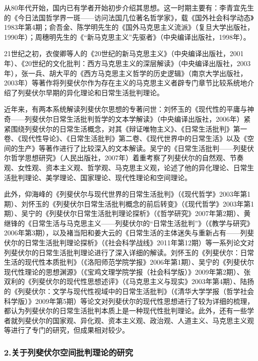 \documentclass[UTF8, fontset = sourcesans, a4paper, oneside, zihao =
-4, scheme=chinese, no-math, space=true]{ctexbook}
\begin{document}
从80年代开始，国内已有学者开始初步介绍其思想。这一时期主要有：李青宜先生的《今日法国哲学界一斑------访问法国几位著名哲学家》，载《国外社会科学动态》1983年第4期；俞吾金、陈学明先生的《国外马克思主义流派》（复旦大学出版社，1990年）；周穗明先生的《``新马克思主义''先驱者》（中央编译出版社，1998年）。

21世纪之初，衣俊卿等人的《20世纪的新马克思主义》（中央编译出版社，2001年）、《20世纪的文化批判：西方马克思主义的深层解读》（中央编译出版社，2003年），张一兵、胡大平的《西方马克思主义哲学的历史逻辑》（南京大学出版社，2003年）等著作将列斐伏尔作为存在主义的马克思主义者辟专门章节比较系统地介绍了列斐伏尔早期的异化理论和日常生活批判理论。

近年来，有两本系统解读列斐伏尔思想的专著问世：刘怀玉的《现代性的平庸与神奇------列斐伏尔日常生活批判哲学的文本学解读》（中央编译出版社，2006年）紧紧围绕列斐伏尔的日常生活概念，对其《辩证唯物主义》、《日常生活批判》第一卷、《现代性导论》、《日常生活批判》第二卷、《现代世界中的日常生活》以及《空间的生产》等著作进行了比较深入的文本解读。吴宁的《日常生活批判------列斐伏尔哲学思想研究》（人民出版社，2007年）着重考察了列斐伏尔的自然观、节奏观、女性观、资本主义观、哲学观、马克思主义观，论述了他的异化理论、日常生活批判理论、美学理论、国家理论、现代性理论和空间理论。

此外，仰海峰的《列斐伏尔与现代世界的日常生活批判》（《现代哲学》2003年第1期）、刘怀玉的《列斐伏尔日常生活批判概念的前后转变》（《现代哲学》2003年第1期）、吴宁的《列斐伏尔日常生活批判理论探析》（《哲学研究》2007年第2期）、黄继锋的《日常生活与马克思主义------列斐伏尔的``日常生活批判''》（《教学与研究》2006年第3期），以及褚当阳和姜大云的《日常生活的主体迷失与重新占有------列斐伏尔的日常生活批判理论探析》（《社会科学战线》2011年第12期）等一系列论文对列斐伏尔的日常生活批判理论进行了深入详细的解读。刘怀玉的《列斐伏尔：日常生活的现代性本质批判》（《洛阳师范学院学报》2006年第1期）、吴宁的《列斐伏尔现代性理论的思想渊源》（《宝鸡文理学院学报（社会科学版）》2009年第2期）、张双利的《列斐伏尔的现代性思想述评》（《马克思主义与现实》2003年第4期）、陆扬的《列斐伏尔：文学与现代性视域中的日常生活批判》（《清华大学学报（哲学社会科学版）》2009年第5期）等论文对列斐伏尔的现代性思想进行了较为详细的梳理，都认为列斐伏尔的日常生活批判本质上是一种现代性批判理论。此外，还有一些学者就列斐伏尔的国家观、异化观、资本主义观、政治观、人道主义、马克思主义观等进行了专门的研究，但成果相对较少。

\subsubsection{2.关于列斐伏尔空间批判理论的研究}\label{part0004.htmlux5cux23e002}
\end{document}
